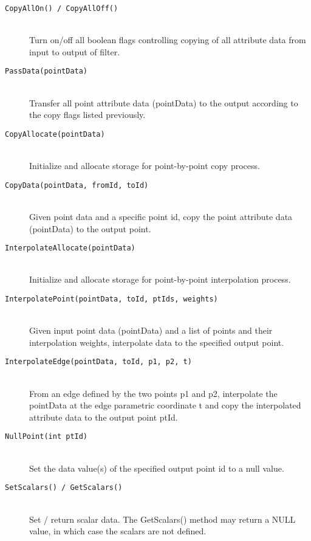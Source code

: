 \begin{description}
\begin{description}
    \item[\texttt{CopyAllOn() / CopyAllOff()}] \hfill \\
    Turn on/off all boolean flags controlling copying of all attribute data from input to output of filter.

    \item[\texttt{PassData(pointData)}] \hfill \\
    Transfer all point attribute data (pointData) to the output according to the copy flags listed previously.

    \item[\texttt{CopyAllocate(pointData)}] \hfill \\
    Initialize and allocate storage for point-by-point copy process.

    \item[\texttt{CopyData(pointData, fromId, toId)}] \hfill \\
    Given point data and a specific point id, copy the point attribute data (pointData) to the output point.

    \item[\texttt{InterpolateAllocate(pointData)}] \hfill \\
    Initialize and allocate storage for point-by-point interpolation process.

    \item[\texttt{InterpolatePoint(pointData, toId, ptIds, weights)}] \hfill \\
    Given input point data (pointData) and a list of points and their interpolation weights, interpolate data to the specified output point.

    \item[\texttt{InterpolateEdge(pointData, toId, p1, p2, t)}] \hfill \\
    From an edge defined by the two points p1 and p2, interpolate the pointData at the edge parametric coordinate t and copy the interpolated attribute data to the output point ptId.

    \item[\texttt{NullPoint(int ptId)}] \hfill \\
    Set the data value(s) of the specified output point id to a null value.

    \item[\texttt{SetScalars() / GetScalars()}] \hfill \\
    Set / return scalar data. The GetScalars() method may return a NULL value, in which case the scalars are not defined.


\end{description}
\end{description}
